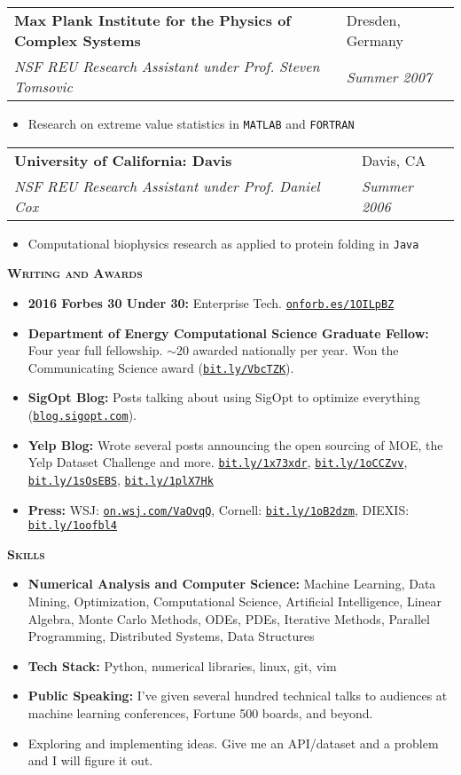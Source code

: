 \documentclass[letterpaper, 11pt]{article}
\makeatletter
\renewcommand{\section}[1]{%
  \begin{tcolorbox}
    \textsc{\textbf{\large{#1}}}
  \end{tcolorbox}
}
\newcommand{\entry}[4]{%
  \begin{tabularx}{\linewidth}{@{}Xl@{}}
    \textbf{#1} & #2          \\
    \textit{#3} & \textit{#4} \\
  \end{tabularx}
}
\newcommand{\website}[1]{\href{http://#1}{\texttt{#1}}}
\makeatother
\begin{document}
  \entry{Max Plank Institute for the Physics of Complex Systems}{Dresden, Germany}{NSF REU Research Assistant under Prof. Steven Tomsovic}{Summer 2007}
  \begin{itemize}
    \item{Research on extreme value statistics in \texttt{MATLAB} and \texttt{FORTRAN}}
  \end{itemize}

  \entry{University of California: Davis}{Davis, CA}{NSF REU Research Assistant under Prof. Daniel Cox}{Summer 2006}
  \begin{itemize}
    \item{Computational biophysics research as applied to protein folding in \texttt{Java}}
  \end{itemize}

  \section{Writing and Awards}

  \begin{itemize}
    \item {\bf 2016 Forbes 30 Under 30:} Enterprise Tech. \website{onforb.es/1OILpBZ}
    \item {\bf Department of Energy Computational Science Graduate Fellow:} Four year full fellowship. $\sim$20 awarded nationally per year. Won the Communicating Science award (\website{bit.ly/VbcTZK}).
    \item {\bf SigOpt Blog:} Posts talking about using SigOpt to optimize everything (\website{blog.sigopt.com}).
    \item {\bf Yelp Blog:} Wrote several posts announcing the open sourcing of MOE, the Yelp Dataset Challenge and more. \website{bit.ly/1x73xdr}, \website{bit.ly/1oCCZvv}, \website{bit.ly/1sOsEBS}, \website{bit.ly/1plX7Hk}
    \item {\bf Press:} WSJ: \website{on.wsj.com/VaOvqQ}, Cornell: \website{bit.ly/1oB2dzm},  DIEXIS: \website{bit.ly/1oofbl4}
  \end{itemize}

  \section{Skills}

  \begin{itemize}
    \item {\bf Numerical Analysis and Computer Science:} Machine Learning, Data Mining, Optimization, Computational Science, Artificial Intelligence, Linear Algebra, Monte Carlo Methods, ODEs, PDEs, Iterative Methods, Parallel Programming, Distributed Systems, Data Structures
    \item {\bf Tech Stack:} Python, numerical libraries, linux, git, vim
    \item {\bf Public Speaking:} I've given several hundred technical talks to audiences at machine learning conferences, Fortune 500 boards, and beyond.
    \item Exploring and implementing ideas. Give me an API/dataset and a problem and I will figure it out.
  \end{itemize}
\end{document}
